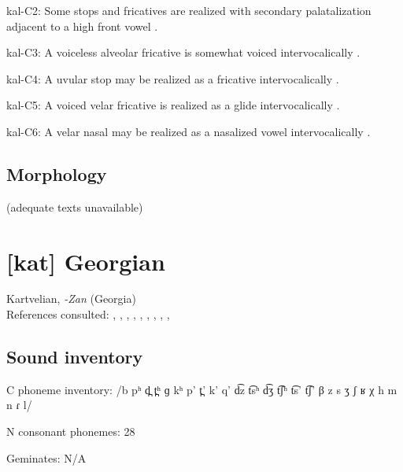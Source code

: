 {\begin{appendixdesc}
\item[kal-C2:] Some stops and fricatives are realized with secondary palatalization adjacent to a high front vowel \citep[333]{Fortescue1984}.

\item[kal-C3:] A voiceless alveolar fricative is somewhat voiced intervocalically \citep[334]{Fortescue1984}.

\item[kal-C4:] A uvular stop may be realized as a fricative intervocalically \citep[333]{Fortescue1984}.

\item[kal-C5:] A voiced velar fricative is realized as a glide intervocalically \citep[334]{Fortescue1984}.

\item[kal-C6:] A velar nasal may be realized as a nasalized vowel intervocalically \citep[334]{Fortescue1984}.
\end{appendixdesc}
\subsection*{Morphology}

(adequate texts unavailable)

\section*{[kat] Georgian}  %
Kartvelian, \textit{-Zan} (Georgia)\medskip\\
References consulted: \citet{Aronson1990}, \citet{Aronson1991}, \citet{Butskhrikidze2002}, \citet{Chitoran1998}, \citet{Hewitt1995}, \citet{JunEtAl2006}, \citet{ShostedChikovani2006}, \citet{SkopeteasFéry2010}, \citet{Vicenek2010}, \citet{Vogt1958}

\subsection*{Sound inventory}
\begin{appendixdesc}

\item[C phoneme inventory:] /b pʰ d̪ t̪ʰ ɡ kʰ p’ t̪’ k’ q’ d͡z t͡sʰ d͡ʒ t͡ʃʰ t͡s’ t͡ʃ’ β z s ʒ ʃ ʁ χ h m n ɾ l/

\item[N consonant phonemes:] 28

\item[Geminates:] N/A


\end{appendixdesc}}
